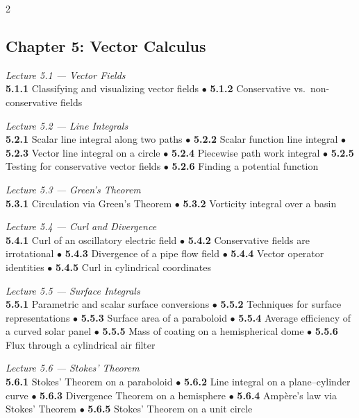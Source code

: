 \begin{multicols}{2}
\subsection*{Chapter 5: Vector Calculus}

\noindent\textit{Lecture 5.1 --- Vector Fields}\\
\textbf{5.1.1} Classifying and visualizing vector fields \(\bullet\)
\textbf{5.1.2} Conservative vs.\ non-conservative fields

\medskip
\noindent\textit{Lecture 5.2 --- Line Integrals}\\
\textbf{5.2.1} Scalar line integral along two paths \(\bullet\)
\textbf{5.2.2} Scalar function line integral \(\bullet\)
\textbf{5.2.3} Vector line integral on a circle \(\bullet\)
\textbf{5.2.4} Piecewise path work integral \(\bullet\)
\textbf{5.2.5} Testing for conservative vector fields \(\bullet\)
\textbf{5.2.6} Finding a potential function

\medskip
\noindent\textit{Lecture 5.3 --- Green's Theorem}\\
\textbf{5.3.1} Circulation via Green's Theorem \(\bullet\)
\textbf{5.3.2} Vorticity integral over a basin

\medskip
\noindent\textit{Lecture 5.4 --- Curl and Divergence}\\
\textbf{5.4.1} Curl of an oscillatory electric field \(\bullet\)
\textbf{5.4.2} Conservative fields are irrotational \(\bullet\)
\textbf{5.4.3} Divergence of a pipe flow field \(\bullet\)
\textbf{5.4.4} Vector operator identities \(\bullet\)
\textbf{5.4.5} Curl in cylindrical coordinates

\medskip
\noindent\textit{Lecture 5.5 --- Surface Integrals}\\
\textbf{5.5.1} Parametric and scalar surface conversions \(\bullet\)
\textbf{5.5.2} Techniques for surface representations \(\bullet\)
\textbf{5.5.3} Surface area of a paraboloid \(\bullet\)
\textbf{5.5.4} Average efficiency of a curved solar panel \(\bullet\)
\textbf{5.5.5} Mass of coating on a hemispherical dome \(\bullet\)
\textbf{5.5.6} Flux through a cylindrical air filter

\medskip
\noindent\textit{Lecture 5.6 --- Stokes' Theorem}\\
\textbf{5.6.1} Stokes' Theorem on a paraboloid \(\bullet\)
\textbf{5.6.2} Line integral on a plane--cylinder curve \(\bullet\)
\textbf{5.6.3} Divergence Theorem on a hemisphere \(\bullet\)
\textbf{5.6.4} Amp\`ere's law via Stokes' Theorem \(\bullet\)
\textbf{5.6.5} Stokes' Theorem on a unit circle


\end{multicols}
